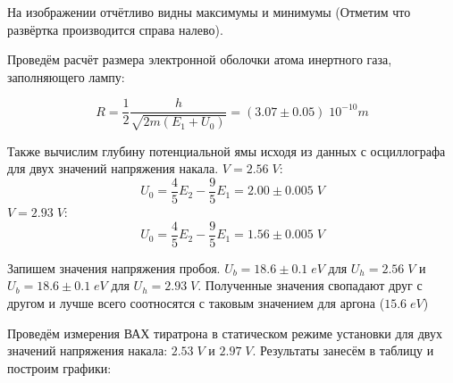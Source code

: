 \documentclass{article}
\begin{document}
На изображении отчётливо видны максимумы и минимумы (Отметим что развёртка производится
справа налево).

Проведём расчёт размера электронной оболочки атома инертного газа, заполняющего лампу:

\[ R = \frac{1}{2}\frac{h}{\sqrt{2m(E_1 + U_0)}} = (3.07 \pm 0.05)\;10^{-10}m  \]

Также вычислим глубину потенциальной ямы исходя из данных с осциллографа для двух значений
напряжения накала.
\(V = 2.56\;V\):
\[ U_0 = \frac{4}{5}E_2 - \frac{9}{5}E_1 = 2.00 \pm 0.005 \;V\]
\(V = 2.93\;V\):
\[ U_0 = \frac{4}{5}E_2 - \frac{9}{5}E_1 = 1.56 \pm 0.005\;V\]

Запишем значения напряжения пробоя. \(U_b = 18.6 \pm 0.1\;eV\) для \(U_h = 2.56\;V\) и
\(U_b = 18.6 \pm 0.1\;eV\) для \(U_h = 2.93\;V\). Полученные значения свопадают друг с другом
и лучше всего соотносятся с таковым значением для аргона (\(15.6\;eV\))

Проведём измерения ВАХ тиратрона в статическом режиме установки для двух значений
напряжения накала: \(2.53\;V\) и \(2.97\;V\). Результаты занесём в таблицу и построим графики:
\end{document}
